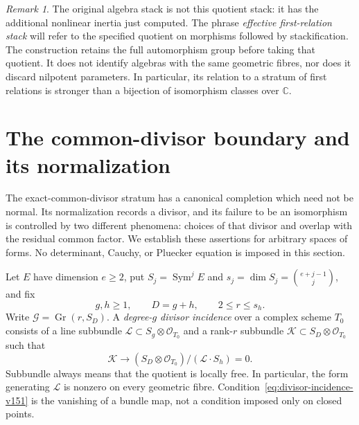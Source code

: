 \documentclass[11pt,reqno]{amsart}
\numberwithin{equation}{section}
\theoremstyle{definition}\newtheorem{definition}[theorem]{Definition}
\theoremstyle{remark}\newtheorem{remark}[theorem]{Remark}
\newcommand{\C}{\mathbb C}\newcommand{\Q}{\mathbb Q}
\newcommand{\OO}{\mathcal O}\newcommand{\II}{\mathcal I}
\DeclareMathOperator{\Sym}{Sym}\DeclareMathOperator{\Gr}{Gr}
\begin{document}
\begin{remark}\label{rem:algebra-inertia}
The original algebra stack is not this quotient stack: it has the
additional nonlinear inertia just computed.  The phrase
\emph{effective first-relation stack} will refer to the specified
quotient on morphisms followed by stackification.  The construction
retains the full automorphism group before taking that quotient.
It does not identify algebras with the same geometric fibres, nor
does it discard nilpotent parameters.  In particular, its relation
to a stratum of first relations is stronger than a bijection of
isomorphism classes over \(\C\).
\end{remark}

\section{The common-divisor boundary and its normalization}
\label{sec:canonical-boundary-v151}

The exact-common-divisor stratum has a canonical completion which need
not be normal.  Its normalization records a divisor, and its failure to
be an isomorphism is controlled by two different phenomena: choices of
that divisor and overlap with the residual common factor.  We establish
these assertions for arbitrary spaces of forms.  No determinant, Cauchy,
or Pluecker equation is imposed in this section.

Let \(E\) have dimension \(e\geq2\), put \(S_j=\Sym^j E\) and
\(s_j=\dim S_j=\binom{e+j-1}{j}\), and fix
\[
             g,h\geq1,\qquad D=g+h,\qquad 2\leq r\leq s_h.
\]
Write \(\mathscr G=\Gr(r,S_D)\).  A \emph{degree-\(g\) divisor
incidence} over a complex scheme \(T_0\) consists of a line subbundle
\(\mathcal L\subset S_g\otimes\OO_{T_0}\) and a rank-\(r\)
subbundle \(\mathcal K\subset S_D\otimes\OO_{T_0}\) such that
\begin{equation}\label{eq:divisor-incidence-v151}
 \mathcal K\longrightarrow
 (S_D\otimes\OO_{T_0})/(\mathcal L\cdot S_h)=0.
\end{equation}
Subbundle always means that the quotient is locally free.  In
particular, the form generating \(\mathcal L\) is nonzero on every
geometric fibre.  Condition~\eqref{eq:divisor-incidence-v151} is the
vanishing of a bundle map, not a condition imposed only on closed points.
\end{document}
